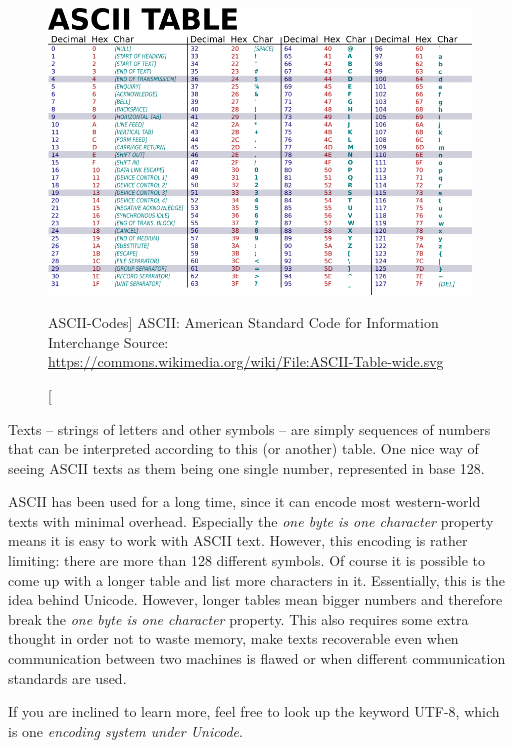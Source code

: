 \begin{figure}
\includegraphics[width=\linewidth]{./gfx/ASCII_table}\newline
\caption
	[ASCII-Codes]
	{ASCII: American Standard Code for Information Interchange\newline
         Source: \url{https://commons.wikimedia.org/wiki/File:ASCII-Table-wide.svg}
    }
\label{fig:ASCII}
\end{figure}

Texts -- \ie strings of letters and other symbols -- are simply sequences of numbers that can be interpreted according to this (or another) table. One nice way of seeing ASCII texts as them being one single number, represented in base 128.

\begin{plusbox}
ASCII has been used for a long time, since it can encode most western-world texts with minimal overhead. Especially the \emph{one byte is one character} property means it is easy to work with ASCII text. However, this encoding is rather limiting: there are more than 128 different symbols. Of course it is possible to come up with a longer table and list more characters in it. Essentially, this is the idea behind Unicode. However, longer tables mean bigger numbers and therefore break the \emph{one byte is one character} property. This also requires some extra thought in order not to waste memory, make texts recoverable even when communication between two machines is flawed or when different communication standards are used.

If you are inclined to learn more, feel free to look up the keyword UTF-8, which is one \emph{encoding system under Unicode}.
\end{plusbox}

